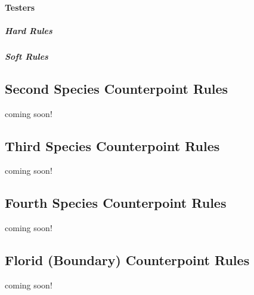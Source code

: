 \paragraph{Testers}
\subparagraph{Hard Rules}
\subparagraph{Soft Rules}

\subsection{Second Species Counterpoint Rules}
coming soon!
\subsection{Third Species Counterpoint Rules}
coming soon!
\subsection{Fourth Species Counterpoint Rules}
coming soon!
\subsection{Florid (Boundary) Counterpoint Rules}
coming soon!
